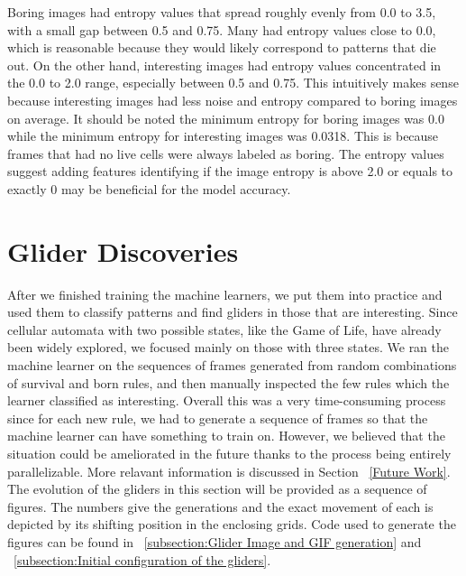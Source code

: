 \documentclass[12pt]{article}
\numberwithin{figure}{section} %
\begin{document}
Boring images had entropy values that spread roughly evenly from 0.0 to 3.5, with a small gap between 0.5 and 0.75. Many had entropy values close to 0.0, which is reasonable because they would likely correspond to patterns that die out. On the other hand, interesting images had entropy values concentrated in the 0.0 to 2.0 range, especially between 0.5 and 0.75. This intuitively makes sense because interesting images had less noise and entropy compared to boring images on average. It should be noted the minimum entropy for boring images was 0.0 while the minimum entropy for interesting images was 0.0318. This is because frames that had no live cells were always labeled as boring. The entropy values suggest adding features identifying if the image entropy is above 2.0 or equals to exactly 0 may be beneficial for the model accuracy. 

\newpage
\section{Glider Discoveries}
\label{Glider Discoveries}
After we finished training the machine learners, we put them into practice and used them to classify patterns and find gliders in those that are interesting. Since cellular automata with two possible states, like the Game of Life, have already been widely explored, we focused mainly on those with three states. We ran the machine learner on the sequences of frames generated from random combinations of survival and born rules, and then manually inspected the few rules which the learner classified as interesting. Overall this was a very time-consuming process since for each new rule, we had to generate a sequence of frames so that the machine learner can have something to train on. However, we believed that the situation could be ameliorated in the future thanks to the process being entirely parallelizable. More relavant information is discussed in Section ~\ref{Future Work}. The evolution of the gliders in this section will be provided as a sequence of figures. The numbers give the generations and the exact movement of each is depicted by its shifting position in the enclosing grids. Code used to generate the figures can be found in ~\ref{subsection:Glider Image and GIF generation} and ~\ref{subsection:Initial configuration of the gliders}. 
\end{document}
